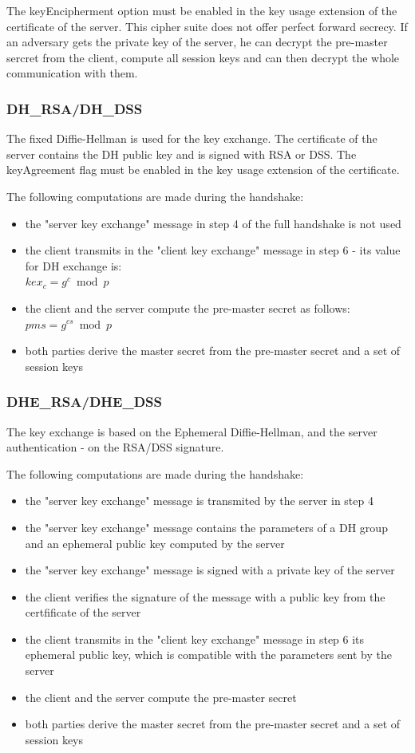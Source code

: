 The keyEncipherment option must be enabled in the key usage extension of the certificate of the server.
This cipher suite does not offer perfect forward secrecy. If an adversary gets the private key of the server, he can decrypt the pre-master sercret from the client, compute all session keys and can then decrypt the whole communication with them.

\subsubsection*{DH\_RSA/DH\_DSS}
The fixed Diffie-Hellman is used for the key exchange. The certificate of the server contains the DH public key and is signed with RSA or DSS.
The keyAgreement flag must be enabled in the key usage extension of the certificate.

The following computations are made during the handshake:
\begin{itemize}
	\item the "server key exchange" message in step 4 of the full handshake is not used
	\item the client transmits in the "client key exchange" message in step 6 - its value for DH exchange is: \\ $\displaystyle kex_c = g^c \bmod p $ 
	\item the client and the server compute the pre-master secret as follows: $\displaystyle pms = g^{cs} \bmod p$
	\item both parties derive the master secret from the pre-master secret and a set of session keys
\end{itemize}

\subsubsection*{DHE\_RSA/DHE\_DSS}
The key exchange is based on the Ephemeral Diffie-Hellman, and the server authentication - on the RSA/DSS signature.

The following computations are made during the handshake:
\begin{itemize}
	\item the "server key exchange" message is transmited by the server in step 4
	\item the "server key exchange" message contains the parameters of a DH group and an ephemeral public key computed by the server
	\item the "server key exchange" message is signed with a private key of the server
	\item the client verifies the signature of the message with a public key from the certfificate of the server
	\item the client transmits in the "client key exchange" message in step 6 its ephemeral public key, which is compatible with the parameters sent by the server
	\item the client and the server compute the pre-master secret
	\item both parties derive the master secret from the pre-master secret and a set of session keys
\end{itemize}

